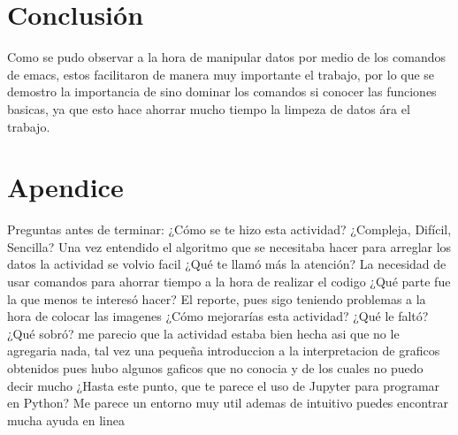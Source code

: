 \documentclass{article}
\begin{document}
\section{Conclusión}
Como se pudo observar a la hora de manipular datos por medio de los comandos de emacs, estos facilitaron de manera muy importante el trabajo, por lo que se demostro la importancia de sino dominar los comandos si conocer las funciones basicas, ya que esto hace ahorrar mucho tiempo la limpeza de datos ára el trabajo.

\section{Apendice}

\newline
Preguntas antes de terminar:
\newline
¿Cómo se te hizo esta actividad? ¿Compleja, Difícil, Sencilla?
\newline
Una vez entendido el algoritmo que se necesitaba hacer para arreglar los datos la actividad se volvio facil
\newline
¿Qué te llamó más la atención?
\newline
La necesidad de usar comandos para ahorrar tiempo a la hora de realizar el codigo
\newline
¿Qué parte fue la que menos te interesó hacer?
\newline
El reporte, pues sigo teniendo problemas a la hora de colocar las imagenes
\newline
¿Cómo mejorarías esta actividad? ¿Qué le faltó? ¿Qué sobró?
\newline
me parecio que la actividad estaba bien hecha asi que no le agregaria nada, tal vez una pequeña introduccion a la interpretacion de graficos obtenidos pues hubo algunos gaficos que no conocia y de los cuales no puedo decir mucho
\newline
¿Hasta este punto, que te parece el uso de Jupyter para programar en Python?
\newline
Me parece un entorno muy util ademas de intuitivo puedes encontrar mucha ayuda en linea
\end{document}

